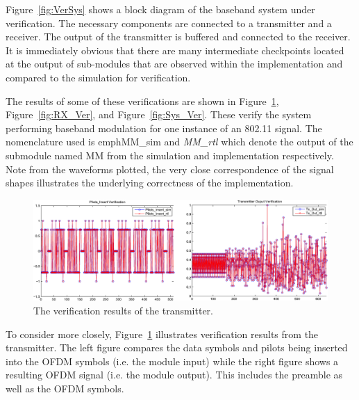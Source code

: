 Figure~\ref{fig:VerSys} shows a block diagram of the baseband system under verification. The necessary components are connected to a transmitter and a receiver. The output of the transmitter is buffered and connected to the receiver. It is immediately obvious that there are many intermediate checkpoints located at the output of sub-modules that are observed within the implementation and compared to the simulation for verification.

The results of some of these verifications are shown in Figure~\ref{fig:TX_Ver}, Figure~\ref{fig:RX_Ver}, and Figure~\ref{fig:Sys_Ver}.
These verify the system performing baseband modulation for one instance of an 802.11 signal. The nomenclature used is emph{MM\_sim} and \emph{MM\_rtl} which denote the output of the submodule named MM from the simulation and implementation respectively. Note from the waveforms plotted, the very close correspondence of the signal shapes illustrates the underlying correctness of the implementation.


\begin{figure}
	\includegraphics[width=1\columnwidth]{Figures/TX_Verification.pdf}
	\caption{The verification results of the transmitter.}
	\label{fig:TX_Ver}
\end{figure}

To consider more closely, Figure~\ref{fig:TX_Ver} illustrates verification results from the transmitter. The left figure compares the data symbols and pilots being inserted into the OFDM symbols (i.e. the module input) while the right figure shows a resulting OFDM signal (i.e. the module output). This includes the preamble as well as the OFDM symbols.

